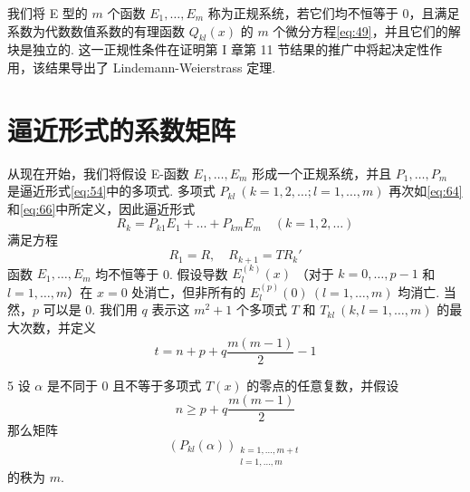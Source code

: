我们将 E 型的 $m$ 个函数 $E_1, \dots, E_m$ 称为正规系统，若它们均不恒等于 0，且满足系数为代数数值系数的有理函数 $Q_{kl}(x)$ 的 $m$ 个微分方程\eqref{eq:49}，并且它们的解块是独立的. 这一正规性条件在证明第 I 章第 11 节结果的推广中将起决定性作用，该结果导出了 Lindemann-Weierstrass 定理.

\section{逼近形式的系数矩阵}

从现在开始，我们将假设 E-函数 $E_1, \dots, E_m$ 形成一个正规系统，并且 $P_1, \dots, P_m$ 是逼近形式\eqref{eq:54}中的多项式. 多项式 $P_{kl} \ (k = 1, 2, \dots; l = 1, \dots, m)$ 再次如\eqref{eq:64}和\eqref{eq:66}中所定义，因此逼近形式
\[R_{k} = P_{k1} E_{1} + \dots + P_{km}E_{m} \quad (k=1,2,\dots)\]
满足方程
\begin{equation}
R_1 = R, \quad R_{k+1} = T R_k' \tag{70}\label{eq:70}
\end{equation}
函数 $E_1, \dots, E_m$ 均不恒等于 0. 假设导数 $E_l^{(k)}(x)$ （对于 $k = 0, \dots, p-1$ 和 $l = 1, \dots, m$）在 $x=0$ 处消亡，但非所有的 $E_l^{(p)}(0) \ (l=1, \dots, m)$ 均消亡. 当然，$p$ 可以是 0. 我们用 $q$ 表示这 $m^2+1$ 个多项式 $T$ 和 $T_{kl} \ (k, l = 1, \dots, m)$ 的最大次数，并定义
\[t = n + p + q \frac{m(m-1)}{2} - 1\]

\begin{mylemma}{}{5}
设 $\alpha$ 是不同于 0 且不等于多项式 $T(x)$ 的零点的任意复数，并假设
\begin{equation}
n \ge p + q \frac{m(m-1)}{2} \tag{71}\label{eq:71}
\end{equation}
那么矩阵
\begin{equation}
\left( P_{kl}(\alpha) \right)_{\substack{k = 1, \dots, m + t \\ l = 1, \dots, m}} \tag{72}\label{eq:72}
\end{equation}
的秩为 $m$.
\end{mylemma}

